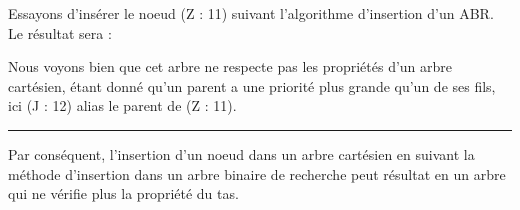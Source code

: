 \documentclass[a4paper,12pt]{report}
\begin{document}
\begin{tcolorbox}[colback=gray!10, colframe=blue!30, coltitle=black, title=Réponse à la 3.a - 2/2]

    Essayons d'insérer le noeud (Z : 11) suivant l'algorithme d'insertion d'un ABR. Le résultat sera :\\

    \begin{center}
    \end{center}

    \vspace{0.5cm}

    Nous voyons bien que cet arbre ne respecte pas les propriétés d'un arbre cartésien, étant donné qu'un parent a une priorité plus grande qu'un de ses 
        fils, ici (J : 12) alias le parent de (Z : 11).

    \vspace{0.5cm}
    \hrule
    \vspace{0.5cm}

    Par conséquent, l'insertion d'un noeud dans un arbre cartésien en suivant la méthode d'insertion dans un arbre binaire de recherche peut résultat en 
        un arbre qui ne vérifie plus la propriété du tas.

\end{tcolorbox}
\end{document}
